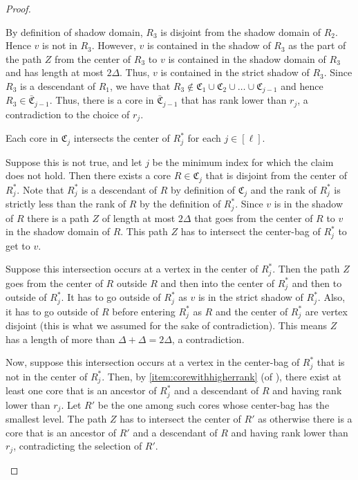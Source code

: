 \documentclass{theoretics}
\def\core{R}
\def\C{\mathfrak{C}}
\def\barC{\bar{\C}}
\begin{document}
\begin{proof}
\begin{subproof}
		By definition of shadow domain, $\core_3$ is disjoint from the shadow domain of $\core_2$. Hence $v$ is not in $\core_3$. However, $v$ is contained in the shadow of $\core_3$ as the part of the path $Z$ from the center of $\core_3$ to $v$ is contained in the shadow domain of $\core_3$ and has length at most $2\Delta$. Thus, $v$ is contained in the strict shadow of $\core_3$. Since $\core_3$ is a descendant of $\core_1$, we have that $\core_3\notin \C_1\cup\C_2\cup\dots\cup\C_{j-1}$ and hence $\core_3\in \barC_{j-1}$. Thus, there is a core in $\barC_{j-1}$ that has rank lower than $r_j$, a contradiction to the choice of $r_j$.
	\end{subproof}
	
	\begin{claim}
		Each core in $\C_j$ intersects the center of $\core^*_j$ for each $j\in [\ell]$. 
		\label{lem:intersectQ_j}
	\end{claim}
	\begin{subproof}
		Suppose this is not true, and let $j$ be the minimum index for which the claim does not hold. Then there exists a core $\core \in \C_j$ that is disjoint from the center of $\core^*_j$. 
		Note that $\core^*_j$ is a descendant of $\core$ by definition of $\C_j$ and the rank of $\core^*_j$ is strictly less than the rank of $\core$ by the definition of $\core^*_j$.
		Since $v$ is in the shadow of $\core$ there is a path $Z$ of length at most $2 \Delta$ that goes from the center of $\core$ to $v$ in the shadow domain of $\core$.
		This path $Z$ has to intersect the center-bag of $\core^*_j$ to get to $v$.
		
		Suppose this intersection occurs at a vertex in the center of $\core^*_j$. Then the path $Z$ goes from the center of $\core$ outside $\core$ and then into the center of $\core^*_j$ and then to outside of $\core^*_j$. It has to go outside of $\core^*_j$ as $v$ is in the strict shadow of $\core^*_j$. Also, it has to go outside of $\core$ before entering $\core^*_j$ as $\core$ and the center of $\core^*_j$ are vertex disjoint (this is what we assumed for the sake of contradiction). 
		This means $Z$ has a length of more than $\Delta+\Delta=2\Delta$, a contradiction.
		
		Now, suppose this intersection occurs at a vertex in the center-bag of $\core^*_j$ that is not in the center of $\core^*_j$.
		Then, by \cref{item:corewithhigherrank} (of ), there exist at least one core that is an ancestor of $\core^*_j$ and a descendant of $\core$ and having rank lower than $r_j$.
		Let $\core'$ be the one among such cores whose center-bag has the smallest level.
		The path $Z$ has to intersect the center of $\core'$ as otherwise
		there is a core that is an ancestor of $\core'$ and a descendant of $\core$ and having rank lower than $r_j$, contradicting the selection of $\core'$.
		

\end{subproof}
\end{proof}
\end{document}
